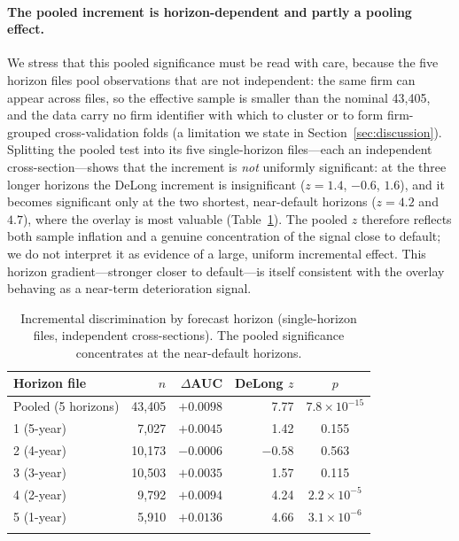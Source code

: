 \documentclass[pdflatex,sn-mathphys-ay]{sn-jnl}
\begin{document}
\paragraph{The pooled increment is horizon-dependent and partly a pooling effect.} We stress that this
pooled significance must be read with care, because the five horizon files pool observations that are
not independent: the same firm can appear across files, so the effective sample is smaller than the
nominal 43{,}405, and the data carry no firm identifier with which to cluster or to form firm-grouped
cross-validation folds (a limitation we state in Section~\ref{sec:discussion}). Splitting the pooled
test into its five single-horizon files---each an independent cross-section---shows that the increment
is \emph{not} uniformly significant: at the three longer horizons the DeLong increment is
insignificant ($z=1.4$, $-0.6$, $1.6$), and it becomes significant only at the two shortest,
near-default horizons ($z=4.2$ and $4.7$), where the overlay is most valuable (Table~\ref{tab:horizon}).
The pooled $z$ therefore reflects both sample inflation and a genuine concentration of the signal close
to default; we do not interpret it as evidence of a large, uniform incremental effect. This horizon
gradient---stronger closer to default---is itself consistent with the overlay behaving as a
near-term deterioration signal.

\begin{table}[t]
\centering
\caption{Incremental discrimination by forecast horizon (single-horizon files, independent
cross-sections). The pooled significance concentrates at the near-default horizons.}
\label{tab:horizon}
\begin{tabular}{@{}lrrrc@{}}
\toprule
Horizon file & $n$ & $\Delta$AUC & DeLong $z$ & $p$ \\
\midrule
Pooled (5 horizons)        & 43{,}405 & $+0.0098$ & 7.77 & $7.8\times10^{-15}$ \\
\midrule
1 (5-year)                 & 7{,}027  & $+0.0045$ & 1.42 & 0.155 \\
2 (4-year)                 & 10{,}173 & $-0.0006$ & $-0.58$ & 0.563 \\
3 (3-year)                 & 10{,}503 & $+0.0035$ & 1.57 & 0.115 \\
4 (2-year)                 & 9{,}792  & $+0.0094$ & 4.24 & $2.2\times10^{-5}$ \\
5 (1-year)                 & 5{,}910  & $+0.0136$ & 4.66 & $3.1\times10^{-6}$ \\
\botrule
\end{tabular}
\end{table}
\end{document}

